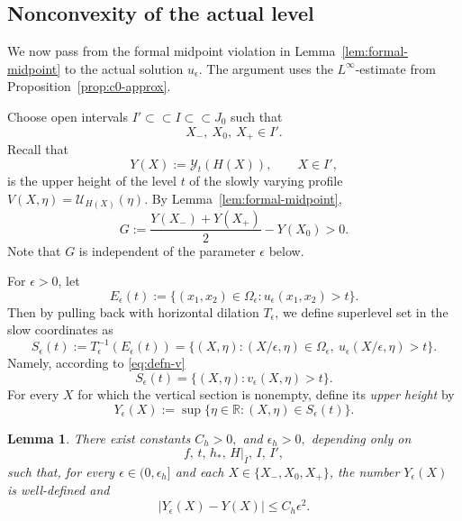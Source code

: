 \documentclass[reqno,12pt]{amsart}
\numberwithin{equation}{section}
\newtheorem{lemma}[theorem]{Lemma}
\theoremstyle{remark}
\begin{document}
\subsection{Nonconvexity of the actual level}\label{sec:nonconvexity}

We now pass from the formal midpoint violation in
Lemma~\ref{lem:formal-midpoint} to the actual solution $u_\epsilon$.  The argument uses the $L^\infty$-estimate from Proposition~\ref{prop:c0-approx}. 

Choose open intervals $I'\subset\subset I\subset\subset J_0$ such that
$$
X_-,\ X_0,\ X_+\in I'.
$$
Recall that
$$
Y(X):=\mathcal Y_t(H(X)),
\qquad X\in I',
$$
is the upper height of the level $t$ of the slowly varying profile
$V(X,\eta)=\mathcal U_{H(X)}(\eta)$.  By Lemma~\ref{lem:formal-midpoint},
\begin{equation}\label{eq:formal-gap}
G:=\frac{Y(X_-)+Y(X_+)}2-Y(X_0)>0.
\end{equation}
Note that $G$ is independent of the parameter $\epsilon$ below. 

For $\epsilon>0$, let 
$$
E_\epsilon(t):=
\{(x_1,x_2)\in\Omega_\epsilon:u_\epsilon(x_1,x_2)>t\}.
$$
Then by pulling back with  horizontal dilation $T_\epsilon$, we define  superlevel set in the slow coordinates as
$$
S_\epsilon(t):=T_\epsilon^{-1}(E_\epsilon(t))=
\{(X,\eta): (X/\epsilon,\eta)\in\Omega_\epsilon,
\ u_\epsilon(X/\epsilon,\eta)>t\}.
$$
Namely, according to \eqref{eq:defn-v}
$$
S_\epsilon(t)=\{(X,\eta):v_\epsilon(X,\eta)>t\}.
$$
For every $X$ for which the vertical section is nonempty, define its \emph{upper height} by
$$
Y_\epsilon(X):=
\sup\{\eta\in\mathbb R:(X,\eta)\in S_\epsilon(t)\}.
$$

\begin{lemma} \label{lem:height-closeness}
There exist constants $C_h>0,$ and $\epsilon_h>0,$
depending only on
$$f,\, t,\, h_*,\, H|_{\overline I},\, I,\, I',$$
such that, for every $\epsilon\in(0,\epsilon_h]$ and each
$X\in\{X_-,X_0,X_+\}$, the number $Y_\epsilon(X)$ is well-defined and
$$
|Y_\epsilon(X)-Y(X)|\le C_h\epsilon^2.
$$
\end{lemma}
\end{document}
